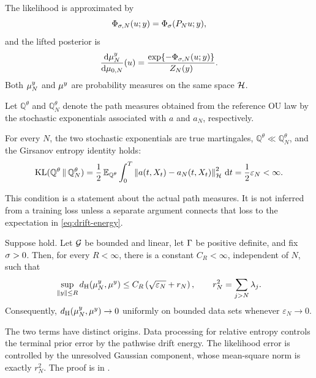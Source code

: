 The likelihood is approximated by
\begin{equation}
  \Phi_{\sigma,N}(u;y)
  =\Phi_{\sigma}(P_Nu;y),
  \label{eq:projected-potential}
\end{equation}
and the lifted posterior is
\begin{equation}
  \frac{\mathrm d{\mu^{y}_{N}}}{\mathrm d\mu_{0,N}}(u)
  =\frac{\exp\{-\Phi_{\sigma,N}(u;y)\}}{Z_N(y)} .
  \label{eq:lifted-posterior}
\end{equation}
Both ${\mu^{y}_{N}}$ and ${\mu^{y}}$ are probability measures on the same space
$\mathcal{H}$.

Let $\mathbb Q^\theta$ and $\mathbb Q_N^\theta$ denote the path
measures obtained from the reference OU law by the stochastic
exponentials associated with $a$ and $a_N$, respectively.

\begin{assumption}
\label{ass:drift-approximation}
For every $N$, the two stochastic exponentials are true martingales,
$\mathbb Q^\theta\ll\mathbb Q_N^\theta$, and the Girsanov entropy
identity holds:
\begin{equation}
  \operatorname{KL}(\mathbb Q^\theta\,\|\,\mathbb Q_N^\theta)
  =\frac12\,
    \mathbb E_{\mathbb Q^\theta}
      \int_0^T\left\lVert a(t,X_t)-a_N(t,X_t)\right\rVert_{\mathcal{H}}^2\,\mathrm dt
  =\frac12\varepsilon_N<\infty .
  \label{eq:drift-energy}
\end{equation}
\end{assumption}

This condition is a statement about the actual path measures.  It is
not inferred from a training loss unless a separate argument connects
that loss to the expectation in \eqref{eq:drift-energy}.

\begin{theorem}
\label{thm:discrete}
Suppose  hold.
Let $\mathcal{G}$ be bounded and linear, let $\Gamma$ be positive definite, and
fix $\sigma>0$.  Then, for every $R<\infty$, there is a constant
$C_R<\infty$, independent of $N$, such that
\begin{equation}
  \sup_{\left\lVert y\right\rVert\leq R}
  {d_{\mathrm{H}}}({\mu^{y}_{N}},{\mu^{y}})
  \leq C_R\left(\sqrt{\varepsilon_N}+r_N\right),
  \qquad
  r_N^2=\sum_{j>N}\lambda_j .
  \label{eq:discretization-bound}
\end{equation}
Consequently, ${d_{\mathrm{H}}}({\mu^{y}_{N}},{\mu^{y}})\to0$ uniformly on bounded data sets
whenever $\varepsilon_N\to0$.
\end{theorem}

The two terms have distinct origins.  Data processing for relative
entropy controls the terminal prior error by the pathwise drift energy.
The likelihood error is controlled by the unresolved Gaussian
component, whose mean-square norm is exactly $r_N^2$.  The proof is in
.

